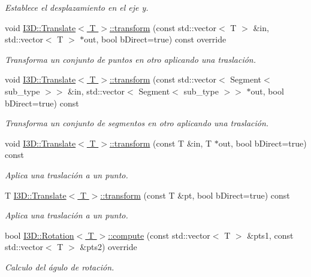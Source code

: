 \begin{DoxyCompactItemize}
\begin{DoxyCompactList}\small\item\em Establece el desplazamiento en el eje y. \end{DoxyCompactList}\item 
void \hyperlink{group__trf2_d_group_ga1e3ba2120da67c8c4606681c4b82f709}{I3\+D\+::\+Translate$<$ T $>$\+::transform} (const std\+::vector$<$ T $>$ \&in, std\+::vector$<$ T $>$ $\ast$out, bool b\+Direct=true) const  override
\begin{DoxyCompactList}\small\item\em Transforma un conjunto de puntos en otro aplicando una traslación. \end{DoxyCompactList}\item 
void \hyperlink{group__trf2_d_group_ga8be3570501a8efb7a67210bb24d5218c}{I3\+D\+::\+Translate$<$ T $>$\+::transform} (const std\+::vector$<$ Segment$<$ sub\+\_\+type $>$$>$ \&in, std\+::vector$<$ Segment$<$ sub\+\_\+type $>$$>$ $\ast$out, bool b\+Direct=true) const 
\begin{DoxyCompactList}\small\item\em Transforma un conjunto de segmentos en otro aplicando una traslación. \end{DoxyCompactList}\item 
void \hyperlink{group__trf2_d_group_ga2f30e8ab65a36498c27994e2887deb80}{I3\+D\+::\+Translate$<$ T $>$\+::transform} (const T \&in, T $\ast$out, bool b\+Direct=true) const 
\begin{DoxyCompactList}\small\item\em Aplica una traslación a un punto. \end{DoxyCompactList}\item 
T \hyperlink{group__trf2_d_group_gafdec629c6bb3f71d71934c43d4a54b74}{I3\+D\+::\+Translate$<$ T $>$\+::transform} (const T \&pt, bool b\+Direct=true) const 
\begin{DoxyCompactList}\small\item\em Aplica una traslación a un punto. \end{DoxyCompactList}\item 
bool \hyperlink{group__trf2_d_group_gae7637f88523deb1879cf8a712820d12e}{I3\+D\+::\+Rotation$<$ T $>$\+::compute} (const std\+::vector$<$ T $>$ \&pts1, const std\+::vector$<$ T $>$ \&pts2) override
\begin{DoxyCompactList}\small\item\em Calculo del águlo de rotación. \end{DoxyCompactList}\item 

\end{DoxyCompactItemize}
